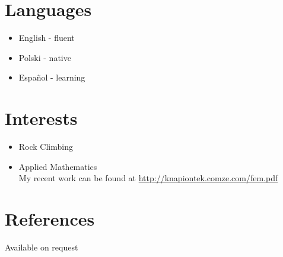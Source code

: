 \documentclass[a4paper,10pt]{article}
\begin{document}
\section*{Languages}

\begin{itemize}
\item English - fluent
\item Polski - native
\item Espa\~{n}ol - learning
\end{itemize}

\section*{Interests}

\begin{itemize}
\item Rock Climbing
\item Applied Mathematics\\My recent work can be found at \url{http://knapiontek.comze.com/fem.pdf}
\end{itemize}

\section*{References}

Available on request
\end{document}

